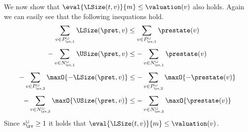 We now show that $\eval{\LSize(t, v)}{m} \leq \valuation(v)$ also holds.
Again we can easily see that the following inequations hold.
\[ \sum_{v \in P_{\rv,1}^\sqcup} \LSize(\pret, v) \leq \sum_{v \in P_{\rv,1}^\sqcup} \prestate(v) \]
\[ - \sum_{v \in N_{\rv,1}^\sqcup} \USize(\pret, v) \leq - \sum_{v \in N_{\rv,1}^\sqcup} \prestate(v) \]
\[ - \sum_{v \in P_{\rv,2}^\sqcup} \maxO{-\LSize(\pret, v)} \leq - \sum_{v \in P_{\rv,2}^\sqcup} \maxO{-\prestate(v)} \]
\[ - \sum_{v \in N_{\rv,2}^\sqcup} \maxO{\USize(\pret, v)} \leq - \sum_{v \in N_{\rv,2}^\sqcup} \maxO{\prestate(v)} \]
Since $s^\sqcup_\rv \geq 1$ it holds that $\eval{\LSize(t, v)}{m} \leq \valuation(v)$.
